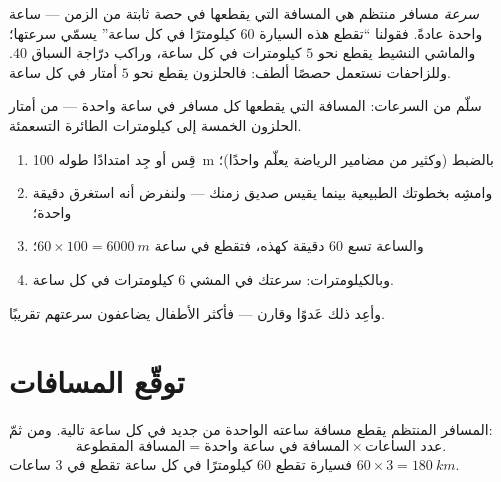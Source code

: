 \begin{definition}[السرعة]\label{def:g5:speed-distance-time:speed}
\emph{سرعة} مسافر منتظم هي المسافة التي يقطعها في
حصة ثابتة من الزمن --- ساعة واحدة عادةً. فقولنا ``تقطع هذه
السيارة $60$ كيلومترًا في كل ساعة'' يسمّي سرعتها؛ والماشي النشيط
يقطع نحو $5$ كيلومترات في كل ساعة، وراكب درّاجة السباق $40$.
وللزاحفات نستعمل حصصًا ألطف: فالحلزون يقطع نحو $5$ أمتار في كل
ساعة.
\end{definition}

\begin{omfigure}

{\small سلّم من السرعات: المسافة التي يقطعها كل مسافر في ساعة
واحدة --- من أمتار الحلزون الخمسة إلى كيلومترات الطائرة
التسعمئة.}
\end{omfigure}

\begin{method}\label{met:g5:speed-distance-time:measure}
\begin{enumerate}
  \item قِس أو جِد امتدادًا طوله \qty{100}{m} بالضبط (وكثير من
        مضامير الرياضة يعلّم واحدًا)؛
  \item وامشِه بخطوتك الطبيعية بينما يقيس صديق زمنك --- ولنفرض
        أنه استغرق دقيقة واحدة؛
  \item والساعة تسع $60$ دقيقة كهذه، فتقطع في ساعة
        $60 \times 100 = \qty{6000}{m}$؛
  \item وبالكيلومترات: سرعتك في المشي $6$ كيلومترات في كل ساعة.
\end{enumerate}
وأعِد ذلك عَدوًا وقارن --- فأكثر الأطفال يضاعفون سرعتهم
تقريبًا.
\end{method}

\section{توقّع المسافات}

\begin{proposition}\label{prop:g5:speed-distance-time:distance}
المسافر المنتظم يقطع مسافة ساعته الواحدة من جديد في كل ساعة
تالية. ومن ثمّ:
\[
\text{المسافة المقطوعة} = \text{المسافة في ساعة واحدة} \times
\text{عدد الساعات}.
\]
فسيارة تقطع $60$ كيلومترًا في كل ساعة تقطع في $3$ ساعات
$60 \times 3 = \qty{180}{km}$.
\end{proposition}

